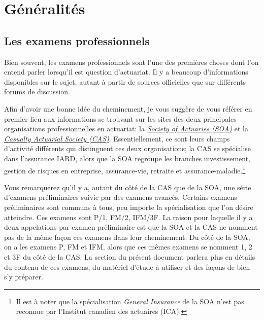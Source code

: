 \section*{Généralités}
\label{sec:generalites}

\subsection*{Les examens professionnels}
\label{subsec:examsprofs}
\captionsetup{justification=centering}
Bien souvent, les examens professionnels sont l'une des premières choses dont l'on entend parler lorsqu'il est question d'actuariat. Il y a beaucoup d'informations disponibles sur le sujet, autant à partir de sources officielles que sur différents forums de discussion.\vspace{\baselineskip}

Afin d'avoir une bonne idée du cheminement, je vous suggère de vous référer en premier lieu aux informations se trouvant sur les sites des deux principales organisations professionnelles en actuariat: la \href{https://soa.org/member/}{\emph{Society of Actuaries (SOA)}} et la \href{http://www.casact.org/}{\emph{Casualty Actuarial Society (CAS)}}. Essentiellement, ce sont leurs champs d'activité différents qui distinguent ces deux organisations; la CAS se spécialise dans l'assurance IARD, alors que la SOA regroupe les branches investissement, gestion de risques en entreprise, assurance-vie, retraite et assurance-maladie.\footnote{ Il est à noter que la spécialisation \emph{General Insurance} de la SOA n'est pas reconnue par l'Institut canadien des actuaires (ICA).}\vspace{\baselineskip}

Vous remarquerez qu'il y a, autant du côté de la CAS que de la SOA, une série d'examens préliminaires suivie par des examens avancés. Certains examens préliminaires sont communs à tous, peu importe la spécialisation que l'on désire atteindre. Ces examens sont P/1, FM/2, IFM/3F. La raison pour laquelle il y a deux appelations par examen préliminaire est que la SOA et la CAS ne nomment pas de la même façon ces examens dans leur cheminement. Du côté de la SOA, on a les examens P, FM et IFM, alors que ces mêmes examens se nomment 1, 2 et 3F du côté de la CAS. La section  du présent document parlera plus en détails du contenu de ces examens, du matériel d'étude à utiliser et des façons de bien s'y préparer.\vspace{\baselineskip}

